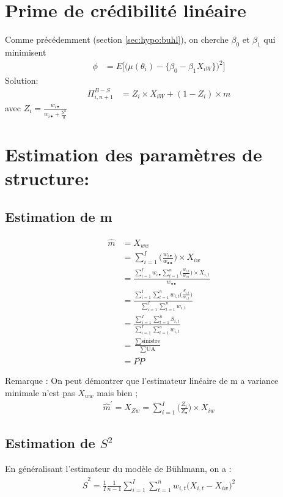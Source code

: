 \section{Prime de crédibilité linéaire}
Comme précédemment (section \ref{sec:hypo:buhl}), on cherche $\beta_0$ et $\beta_1$ qui minimisent 
\begin{align*}
\phi &= E \Big[ \big( \mu(\theta_i) - \lbrace \beta_0 -\beta_1 X_{i W} \rbrace \big)^2  \Big]
\end{align*}
Solution: 
\begin{align*}
\Pi_{i, n+1}^{B-S} &= Z_i \times X_{i W} + (1 - Z_i) \times m
\end{align*}
avec $Z_i = \frac{w_{i \bullet}}{w_{i \bullet} + \frac{S^2}{a}}$

\section{Estimation des paramètres de structure:}

\subsection{Estimation de m}
\begin{align*}
\widehat{m} &= X_{ww} \\
&= \sum_{i=1}^{I} \Big(\frac{w_{i \bullet}}{w_{\bullet \bullet}} \Big) \times X_{iw} \\
&= \frac{\sum_{i=1}^{I} w _{i \bullet} \sum_{t=1}^{n} \Big(\frac{w_{i, t}}{w_{i \bullet}} \Big) \times X_{i,t}}{w_{\bullet \bullet}}\\
&= \frac{\sum_{i=1}^{I} \sum_{t=1}^{n} w_{i, t}\Big(\frac{S_{i,t}}{w_{i,t}} \Big)}{\sum_{i=1}^{I} \sum_{t=1}^{n} w_{i,t}}\\
&= \frac{\sum_{i=1}^{I} \sum_{t=1}^{n} S_{i,t}}{\sum_{i=1}^{I} \sum_{t=1}^{n} w_{i,t}}\\
&= \frac{\sum \text{sinistre}}{\sum \text{UA}} \\
&= \overline{PP}
\end{align*}

Remarque :
On peut démontrer que l'estimateur linéaire de m a variance minimale n'est pas $X_{ww}$ mais bien ;
\begin{align*}
\widehat{m}^{'} = X_{Zw} = \sum_{i=1}^{I} \Big(\frac{Z_i}{Z_{\bullet}} \Big) \times X_{iw}
\end{align*}

\subsection{Estimation de $S^2$}
En généralisant l'estimateur du modèle de Bühlmann, on a :
\begin{align*}
\widehat{S}^2 = \frac{1}{I} \frac{1}{n-1} \sum_{i=1}^{I} \sum_{t=1}^{n} w_{i,t} \Big( X_{i,t} - X_{iw}\Big)^2 
\end{align*}

